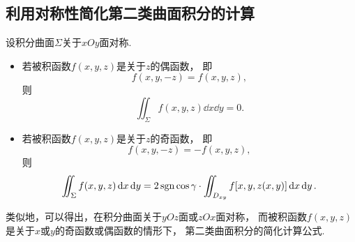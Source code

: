 \subsection{利用对称性简化第二类曲面积分的计算}
设积分曲面\(\Sigma\)关于\(xOy\)面对称.
\begin{itemize}
	\item 若被积函数\(f(x,y,z)\)是关于\(z\)的偶函数，
	即\[
		f(x,y,-z) = f(x,y,z),
	\]
	则\[
		\iint_\Sigma f(x,y,z) \dd{x}\dd{y} = 0.
	\]

	\item 若被积函数\(f(x,y,z)\)是关于\(z\)的奇函数，
	即\[
		f(x,y,-z) = -f(x,y,z),
	\]
	则\[
		\iint_\Sigma f(x,y,z) \dd{x}\dd{y}
		= 2 \operatorname{sgn}\cos\gamma \cdot \iint_{D_{xy}} f[x,y,z(x,y)] \dd{x}\dd{y}.
	\]
\end{itemize}

类似地，可以得出，在积分曲面关于\(yOz\)面或\(zOx\)面对称，
而被积函数\(f(x,y,z)\)是关于\(x\)或\(y\)的奇函数或偶函数的情形下，
第二类曲面积分的简化计算公式.
